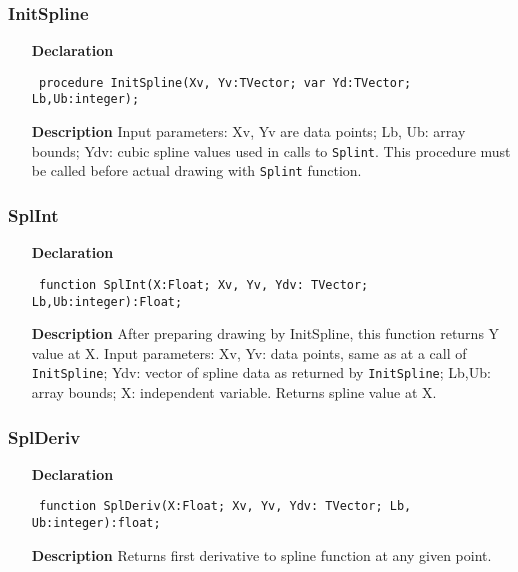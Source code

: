 \documentclass[12pt,a4paper,oneside]{report}
\newcommand{\declarationitem}[1]{\textbf{#1}}
\newcommand{\descriptiontitle}[1]{\textbf{#1}}
\newcommand{\code}[1]{\texttt{#1}}
\begin{document}
\subsubsection{InitSpline}
\label{uSpline-InitSpline}
\begin{itemize}\item[\declarationitem{Declaration}\hfill]
	\begin{flushleft}
		\code{
			procedure InitSpline(Xv, Yv:TVector; var Yd:TVector; Lb,Ub:integer);}
		
	\end{flushleft}
	
	\par
	\item[\descriptiontitle{Description}]
	Input parameters: Xv, Yv are data points; Lb, Ub:  array bounds; Ydv: cubic spline values used in calls to \code{Splint}. This procedure must be called before actual drawing with \code{Splint} function.
\end{itemize}
\subsubsection{SplInt}
\label{uSpline-SplInt}
\begin{itemize}\item[\declarationitem{Declaration}\hfill]
	\begin{flushleft}
		\code{
			function SplInt(X:Float; Xv, Yv, Ydv: TVector; Lb,Ub:integer):Float;}
	\end{flushleft}
	\par
	\item[\descriptiontitle{Description}]
	After preparing drawing by InitSpline, this function returns Y value at X. Input parameters: Xv, Yv: data points, same as at a call of \code{InitSpline}; Ydv: vector of spline data as returned by \code{InitSpline}; Lb,Ub: array bounds; X: independent variable. Returns spline value at X.
	
\end{itemize}
\subsubsection{SplDeriv}
\label{uSpline-SplDeriv}
\begin{itemize}\item[\declarationitem{Declaration}\hfill]
	\begin{flushleft}
		\code{
			function SplDeriv(X:Float; Xv, Yv, Ydv: TVector; Lb, Ub:integer):float;}
		
	\end{flushleft}
	
	\par
	\item[\descriptiontitle{Description}]
	Returns first derivative to spline function at any given point.
	
\end{itemize}
\end{document}
